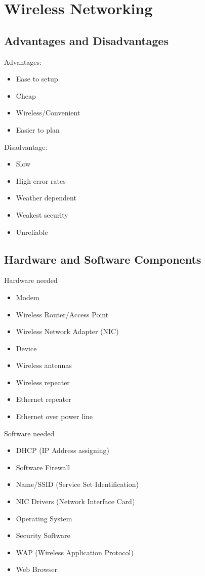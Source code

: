 \documentclass[../notes.tex]{subfiles}
\begin{document}
\section{Wireless Networking}

\subsection{Advantages and Disadvantages}
Advantages: 
\begin{itemize}
	\item Ease to setup
	\item Cheap
	\item Wireless/Convenient
	\item Easier to plan
\end{itemize}

Disadvantage:
\begin{itemize}
	\item Slow
	\item High error rates
	\item Weather dependent
	\item Weakest security
	\item Unreliable
\end{itemize}

\subsection{Hardware and Software Components}
Hardware needed
\begin{itemize}
	\item Modem 
	\item Wireless Router/Access Point
	\item Wireless Network Adapter (NIC)
	\item Device
	\item Wireless antennas
	\item Wireless repeater
	\item Ethernet repeater
	\item Ethernet over power line
\end{itemize}

Software needed
\begin{itemize}
	\item DHCP (IP Address assigning)
	\item Software Firewall
	\item Name/SSID (Service Set Identification)
	\item NIC Drivers (Network Interface Card)
	\item Operating System
	\item Security Software
	\item WAP (Wireless Application Protocol)
	\item Web Browser
\end{itemize}
\end{document}

